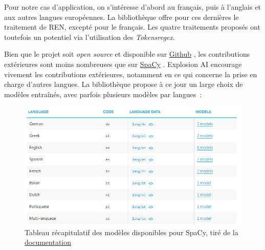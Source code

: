 Pour notre cas d'application, on s'intéresse d'abord au français, puis à l'anglais et aux autres langues européennes. La bibliothèque offre pour ces dernières le traitement de REN, excepté pour le français. Les quatre traitements proposés ont toutefois un potentiel via l'utilisation des \textit{Tokensregex}.
\newline

Bien que le projet soit \textit{open source} et disponible sur \href{https://github.com/stanfordnlp/CoreNLP}{Github} \cite{corenlp-repo}, les contributions extérieures sont moins nombreuses que sur \href{https://github.com/explosion/spaCy}{SpaCy} \cite{spacy-repo}. Explosion AI encourage vivement les contributions extérieures, notamment en ce qui concerne la prise en charge d'autres langues. La bibliothèque propose à ce jour un large choix de modèles entraînés, avec parfois plusieurs modèles par langues~:
 \vspace{10pt}
\begin{figure}[H]
    \centering
    \includegraphics[scale=0.7]{images/spacy-lang.png}
    \caption{Tableau récapitulatif des modèles disponibles pour SpaCy, tiré de la \href{https://spacy.io/usage/models}{documentation} \cite{spacy-lang}}
    \label{fig:spacy-lang}
\end{figure}
\vspace{10pt}

